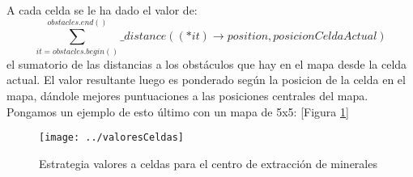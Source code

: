A cada celda se le ha dado el valor de:
\[
\sum_{it=obstacles.begin()}^{obstacles.end()}\_distance((*it) \rightarrow position, posicionCeldaActual)
\]
el sumatorio de las distancias a los obst\'aculos que hay en el mapa desde la celda actual. 
El valor resultante luego es ponderado seg\'un la posicion de la celda en el mapa, 
d\'andole mejores puntuaciones a las posiciones centrales del mapa. Pongamos un ejemplo 
de esto \'ultimo con un mapa de 5x5: [Figura \ref{fig:defenseValueCellsHead}]
\begin{figure}
\centering
\texttt{[image: ../valoresCeldas]} 
\caption{Estrategia valores a celdas para el centro de extracción de minerales}
\label{fig:defenseValueCellsHead}
\end{figure}

